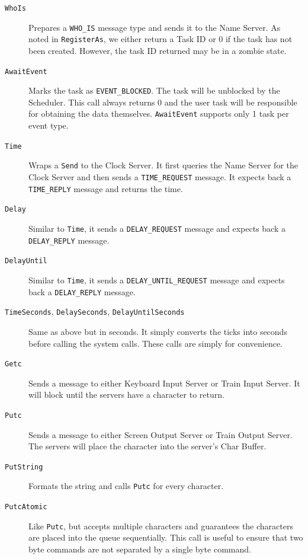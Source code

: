 \documentclass[letterpaper]{article}
\begin{document}
\begin{description}
\item[{\texttt{WhoIs}}] \leavevmode 
Prepares a \texttt{WHO\_IS} message type and sends it to the Name Server. As noted in \texttt{RegisterAs}, we either return a Task ID or 0 if the task has not been created. However, the task ID returned may be in a zombie state.

\item[{\texttt{AwaitEvent}}] \leavevmode 
Marks the task as \texttt{EVENT\_BLOCKED}. The task will be unblocked by the Scheduler. This call always returns 0 and the user task will be responsible for obtaining the data themselves. \texttt{AwaitEvent} supports only 1 task per event type.

\item[{\texttt{Time}}] \leavevmode 
Wraps a \texttt{Send} to the Clock Server. It first queries the Name Server for the Clock Server and then sends a \texttt{TIME\_REQUEST} message. It expects back a \texttt{TIME\_REPLY} message and returns the time.

\item[{\texttt{Delay}}] \leavevmode 
Similar to \texttt{Time}, it sends a \texttt{DELAY\_REQUEST} message and expects back a \texttt{DELAY\_REPLY} message.

\item[{\texttt{DelayUntil}}] \leavevmode 
Similar to \texttt{Time}, it sends a \texttt{DELAY\_UNTIL\_REQUEST} message and expects back a \texttt{DELAY\_REPLY} message.

\item[{\texttt{TimeSeconds}, \texttt{DelaySeconds}, \texttt{DelayUntilSeconds}}] \leavevmode 
Same as above but in seconds. It simply converts the ticks into seconds before calling the system calls. These calls are simply for convenience.

\item[{\texttt{Getc}}] \leavevmode 
Sends a message to either Keyboard Input Server or Train Input Server. It will block until the servers have a character to return.

\item[{\texttt{Putc}}] \leavevmode 
Sends a message to either Screen Output Server or Train Output Server. The servers will place the character into the server's Char Buffer.

\item[{\texttt{PutString}}] \leavevmode 
Formats the string and calls \texttt{Putc} for every character.

\item[{\texttt{PutcAtomic}}] \leavevmode 
Like \texttt{Putc}, but accepts multiple characters and guarantees the characters are placed into the queue sequentially. This call is useful to ensure that two byte commands are not separated by a single byte command.


\end{description}
\end{document}
